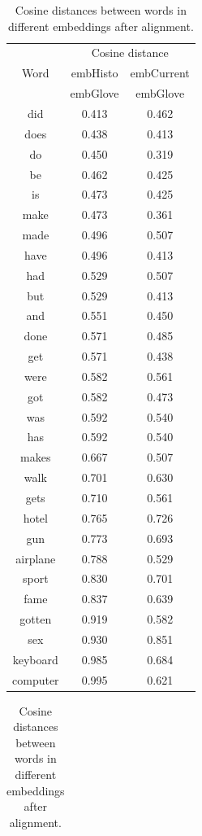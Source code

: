 \documentclass[runningheads]{llncs}
\begin{document}
\begin{table}
\begin{minipage}{.44\linewidth}
\centering
\caption{Cosine distances between words in different embeddings after alignment.}
\label{tab:cosdist}
\begin{tabular}{|c|c|c|}
\hline
\multirow{3}{*}{Word} & \multicolumn{2}{|c|}{Cosine distance}\\\cline{2-3}
&embHisto&embCurrent\\\cline{2-3}
&embGlove&embGlove\\
\hline
did & 0.413 & 0.462\\
does & 0.438 & 0.413\\
do & 0.450 & 0.319\\
be & 0.462 & 0.425\\
is & 0.473 & 0.425\\
make & 0.473 & 0.361\\
made & 0.496 & 0.507\\
have & 0.496 & 0.413\\
had & 0.529 & 0.507\\
but & 0.529 & 0.413\\
and & 0.551 & 0.450\\
done & 0.571 & 0.485\\
get & 0.571 & 0.438\\
were & 0.582 & 0.561\\
got & 0.582 & 0.473\\
was & 0.592 & 0.540\\
has & 0.592 & 0.540\\
makes & 0.667 & 0.507\\
walk & 0.701 & 0.630\\
gets & 0.710 & 0.561\\
hotel & 0.765 & 0.726\\
gun & 0.773 & 0.693\\
airplane & 0.788 & 0.529\\
sport & 0.830 & 0.701\\
fame & 0.837 & 0.639\\
gotten & 0.919 & 0.582\\
sex & 0.930 & 0.851\\
keyboard & 0.985 & 0.684\\
computer & 0.995 & 0.621\\
\hline
\end{tabular}
\end{minipage}
\begin{minipage}{.1\linewidth}
\begin{tabular}{c}

\end{tabular}
\end{minipage}
\end{table}
\end{document}

